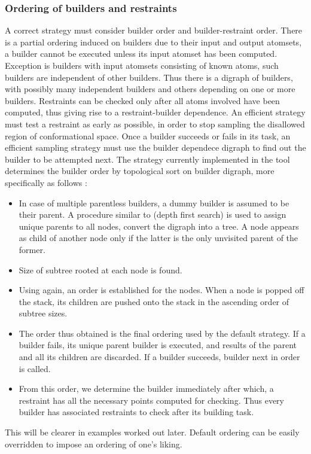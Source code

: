 \documentclass{article}[14pts]
\begin{document}
\subsubsection{Ordering of builders and restraints}
A correct strategy must consider builder order and builder-restraint order. There is a partial ordering induced on builders due to their input and output atomsets, \ie a builder cannot be executed unless its input atomset has been computed. Exception is builders with input atomsets consisting of known atoms, such builders are independent of other builders. Thus there is a digraph of builders, with possibly many independent builders and others depending on one or more builders. Restraints can be checked only after all atoms involved have been computed, thus giving rise to a restraint-builder dependence. An efficient strategy must test a restraint as early as possible, in order to stop sampling the disallowed region of conformational space. Once a builder succeeds or fails in its task, an efficient sampling strategy must use the builder dependece digraph to find out the builder to be attempted next. The strategy currently implemented in the tool determines the builder order by topological sort on builder digraph, more specifically as follows :
\begin{itemize}
\item In case of multiple parentless builders, a dummy builder is assumed to be their parent. A procedure similar to \dfs (depth first search) is used to assign unique parents to all nodes, \ie convert the digraph into a tree. A node appears as child of another node only if the latter is the only unvisited parent of the former.
\item Size of subtree rooted at each node is found.
\item Using \dfs again, an order is established for the nodes. When a node is popped off the \dfs stack, its children are pushed onto the stack in the ascending order of subtree sizes.
\item The order thus obtained is the final ordering used by the default strategy. If a builder fails, its unique parent builder is executed, and results of the parent and all its children are discarded. If a builder succeeds, builder next in order is called. 
\item From this order, we determine the builder immediately after which, a restraint has all the necessary points computed for checking. Thus every builder has associated restraints to check after its building task.
\end{itemize}
This will be clearer in examples worked out later. Default ordering can be easily overridden to impose an ordering of one's liking.
\end{document}
